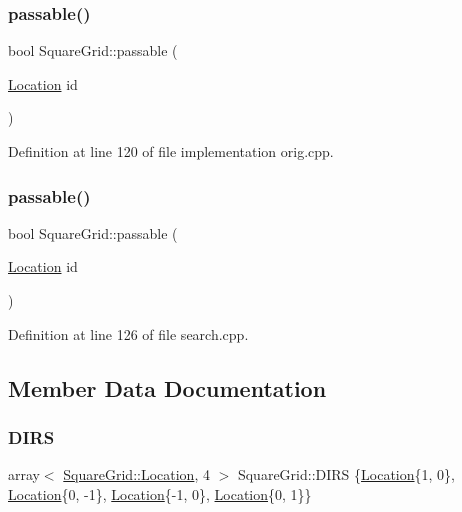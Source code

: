 \subsubsection{\texorpdfstring{passable()}{passable()}\hspace{0.1cm}{\footnotesize\ttfamily [1/2]}}
{\footnotesize\ttfamily bool Square\+Grid\+::passable (\begin{DoxyParamCaption}\item[{\hyperlink{struct_square_grid_a2c9a2cbd3912aa48ac97289abc3f1c0f}{Location}}]{id }\end{DoxyParamCaption})\hspace{0.3cm}{\ttfamily [inline]}}



Definition at line 120 of file implementation orig.\+cpp.

\mbox{\label{struct_square_grid_a3f638b46510dd880823b1acac75c7b96}} 
\subsubsection{\texorpdfstring{passable()}{passable()}\hspace{0.1cm}{\footnotesize\ttfamily [2/2]}}
{\footnotesize\ttfamily bool Square\+Grid\+::passable (\begin{DoxyParamCaption}\item[{\hyperlink{struct_square_grid_a2c9a2cbd3912aa48ac97289abc3f1c0f}{Location}}]{id }\end{DoxyParamCaption})\hspace{0.3cm}{\ttfamily [inline]}}



Definition at line 126 of file search.\+cpp.



\subsection{Member Data Documentation}
\mbox{\label{struct_square_grid_aac91cba6573640c545485ed054089c87}} 
\subsubsection{\texorpdfstring{D\+I\+RS}{DIRS}}
{\footnotesize\ttfamily array$<$ \hyperlink{struct_square_grid_a2c9a2cbd3912aa48ac97289abc3f1c0f}{Square\+Grid\+::\+Location}, 4 $>$ Square\+Grid\+::\+D\+I\+RS \{\hyperlink{struct_square_grid_a2c9a2cbd3912aa48ac97289abc3f1c0f}{Location}\{1, 0\}, \hyperlink{struct_square_grid_a2c9a2cbd3912aa48ac97289abc3f1c0f}{Location}\{0, -\/1\}, \hyperlink{struct_square_grid_a2c9a2cbd3912aa48ac97289abc3f1c0f}{Location}\{-\/1, 0\}, \hyperlink{struct_square_grid_a2c9a2cbd3912aa48ac97289abc3f1c0f}{Location}\{0, 1\}\}\hspace{0.3cm}{\ttfamily [static]}}



